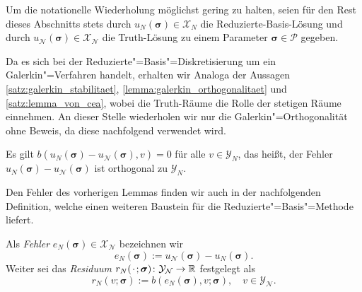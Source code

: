 \documentclass[../main.tex]{subfiles}
\begin{document}
Um die notationelle Wiederholung möglichst gering zu halten, seien für den Rest dieses Abschnitts stets durch $u_{N}(\bm \sigma) \in \mathcal X_{N}$ die Reduzierte-Basis-Lösung und durch $u_{\mathcal N}(\bm \sigma) \in \mathcal X_{\mathcal N}$ die Truth-Lösung zu einem Parameter $\bm \sigma \in \mathcal P$ gegeben.

Da es sich bei der Reduzierte"=Basis"=Diskretisierung um ein Galerkin"=Verfahren handelt, erhalten wir Analoga der Aussagen \cref{satz:galerkin_stabilitaet}, \cref{lemma:galerkin_orthogonalitaet} und \cref{satz:lemma_von_cea}, wobei die Truth-Räume die Rolle der stetigen Räume einnehmen.
An dieser Stelle wiederholen wir nur die Galerkin"=Orthogonalität ohne Beweis, da diese nachfolgend verwendet wird.

\begin{Lemma}
    \label{lemma:rb_galerkin_orthogonalitaet}
    Es gilt $b(u_{N}(\bm \sigma) - u_{\mathcal N}(\bm \sigma), v) = 0$ für alle $v \in \mathcal Y_{N}$, das heißt, der Fehler $u_{N}(\bm \sigma) - u_{\mathcal N}(\bm \sigma)$ ist orthogonal zu $\mathcal Y_{N}$.
\end{Lemma}

Den Fehler des vorherigen Lemmas finden wir auch in der nachfolgenden Definition, welche einen weiteren Baustein für die Reduzierte"=Basis"=Methode liefert.

\begin{Definition}
\label{definition:rbm_fehler_und_residuum}
    Als \emph{Fehler} $e_{N}(\bm \sigma) \in \mathcal X_{\mathcal N}$ bezeichnen wir
    \begin{equation}
        e_{N}(\bm \sigma) := u_{\mathcal N}(\bm \sigma) - u_{N}(\bm \sigma).
    \end{equation}
    Weiter sei das \emph{Residuum} $r_{N}({\mkern2mu\cdot\mkern2mu}; \bm \sigma) \colon \mathcal Y_{\mathcal N} \to \mathbb{R}$ festgelegt als
    \begin{equation}
    \label{eq:variationsproblem_residuum}
        r_{N}(v; \bm \sigma) := b(e_{N}(\bm \sigma), v; \bm \sigma), \quad v \in \mathcal Y_{\mathcal N}.
    \end{equation}
\end{Definition}
\end{document}
